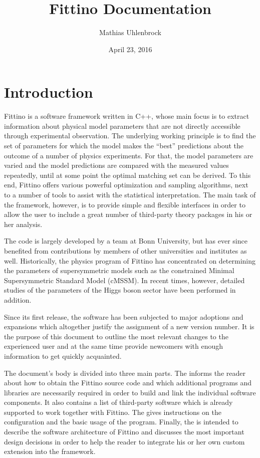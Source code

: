 \documentclass[letterpaper,10pt,english]{sphinxmanual}
\title{Fittino Documentation}
\date{April 23, 2016}
\author{Mathias Uhlenbrock}
\begin{document}
\maketitle
\tableofcontents
{}\label{index::doc}



\chapter{Introduction}
\label{introduction:introduction}\label{introduction::doc}\label{introduction:table-of-contents}
Fittino is a software framework written in C++, whose main focus is to extract information about
physical model parameters that are not directly accessible through experimental observation. The
underlying working principle is to find the set of parameters for which the model makes the ``best''
predictions about the outcome of a number of physics experiments. For that, the model parameters are
varied and the model predictions are compared with the measured values repeatedly, until at some
point the optimal matching set can be derived. To this end, Fittino offers various powerful
optimization and sampling algorithms, next to a number of tools to assist with the statistical
interpretation. The main task of the framework, however, is to provide simple and flexible
interfaces in order to allow the user to include a great number of third-party theory packages in
his or her analysis.

The code is largely developed by a team at Bonn University, but has ever since benefited from
contributions by members of other universities and institutes as well. Historically, the physics
program of Fittino has concentrated on determining the parameters of supersymmetric models such as
the constrained Minimal Supersymmetric Standard Model (cMSSM). In recent times, however, detailed
studies of the parameters of the Higgs boson sector have been performed in addition.

Since its first release, the software has been subjected to major adoptions and expansions which
altogether justify the assignment of a new version number. It is the purpose of this document to
outline the most relevant changes to the experienced user and at the same time provide newcomers
with enough information to get quickly acquainted.

The document's body is divided into three main parts. The {\hyperref[installation_guide:installation-guide]{\emph{}}} informs the
reader about how to obtain the Fittino source code and which additional programs and libraries are
necessarily required in order to build and link the individual software components. It also contains
a list of third-party software which is already supported to work together with Fittino. The
{\hyperref[user_guide:user-guide]{\emph{}}} gives instructions on the configuration and the basic usage of the program.
Finally, the  is intended to describe the software architecture of Fittino and
discusses the most important design decisions in order to help the reader to integrate his or her
own custom extension into the framework.
\end{document}

